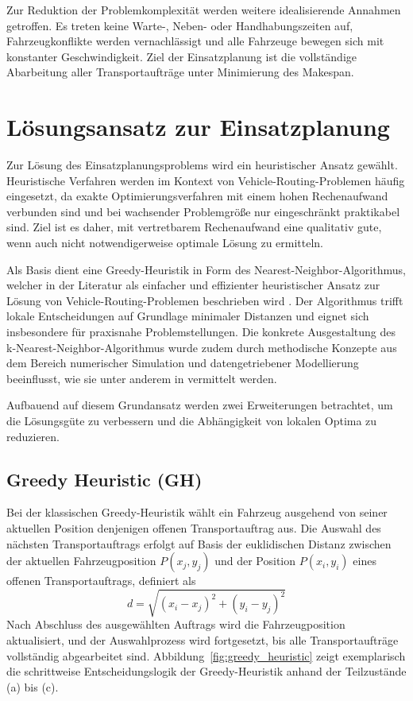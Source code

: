 \documentclass[a4paper,10pt]{article}
\begin{document}
Zur Reduktion der Problemkomplexität werden weitere idealisierende Annahmen getroffen. Es treten
keine Warte-, Neben- oder Handhabungszeiten auf, Fahrzeugkonflikte werden vernachlässigt und alle
Fahrzeuge bewegen sich mit konstanter Geschwindigkeit. Ziel der Einsatzplanung ist die vollständige
Abarbeitung aller Transportaufträge unter Minimierung des Makespan.


\section{Lösungsansatz zur Einsatzplanung}

Zur Lösung des Einsatzplanungsproblems wird ein heuristischer Ansatz gewählt. Heuristische Verfahren
werden im Kontext von Vehicle-Routing-Problemen häufig eingesetzt, da exakte Optimierungsverfahren
mit einem hohen Rechenaufwand verbunden sind und bei wachsender Problemgröße nur eingeschränkt
praktikabel sind. Ziel ist es daher, mit vertretbarem Rechenaufwand eine qualitativ gute, wenn auch
nicht notwendigerweise optimale Lösung zu ermitteln.

Als Basis dient eine Greedy-Heuristik in Form des Nearest-Neighbor-Algorithmus, welcher in der
Literatur als einfacher und effizienter heuristischer Ansatz zur Lösung von Vehicle-Routing-Problemen
beschrieben wird \cite{harahap2023}. Der Algorithmus trifft lokale Entscheidungen auf
Grundlage minimaler Distanzen und eignet sich insbesondere für praxisnahe Problemstellungen.
Die konkrete Ausgestaltung des k-Nearest-Neighbor-Algorithmus wurde zudem durch methodische Konzepte aus dem Bereich
numerischer Simulation und datengetriebener Modellierung beeinflusst, wie sie unter
anderem in \cite{weiner2021} vermittelt werden.

Aufbauend auf diesem Grundansatz werden zwei Erweiterungen betrachtet, um die Lösungsgüte zu
verbessern und die Abhängigkeit von lokalen Optima zu reduzieren.

\subsection{Greedy Heuristic (GH)}

Bei der klassischen Greedy-Heuristik wählt ein Fahrzeug ausgehend von seiner aktuellen Position
denjenigen offenen Transportauftrag aus. Die Auswahl des nächsten Transportauftrags erfolgt auf 
Basis der euklidischen Distanz zwischen der aktuellen Fahrzeugposition $P(x_j, y_j)$ und der 
Position $P(x_i, y_i)$  eines offenen Transportauftrags, definiert als
$$
  d = \sqrt{(x_i - x_j)^2 + (y_i - y_j)^2}
$$
Nach Abschluss des ausgewählten Auftrags wird die
Fahrzeugposition aktualisiert, und der Auswahlprozess wird fortgesetzt, bis alle Transportaufträge
vollständig abgearbeitet sind. Abbildung~\ref{fig:greedy_heuristic} zeigt exemplarisch die schrittweise Entscheidungslogik der
Greedy-Heuristik anhand der Teilzustände (a) bis (c).
\end{document}
